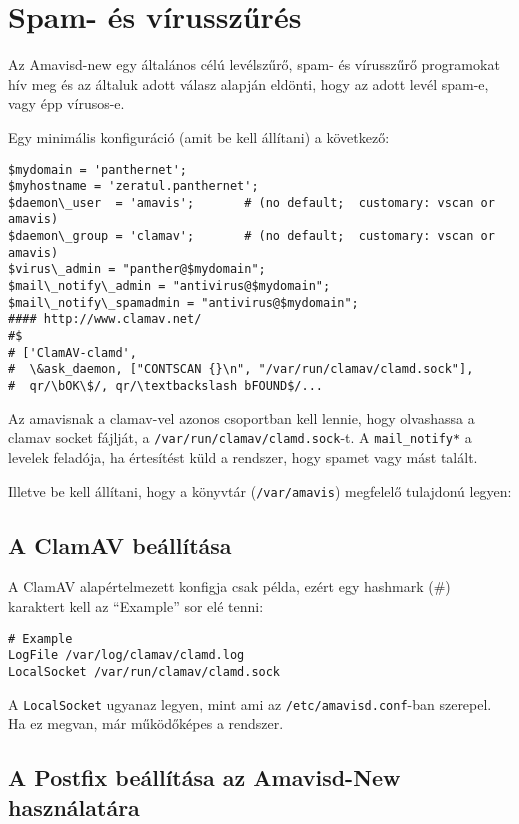 \chapter{Spam- és vírusszűrés}\label{chap:spams-viruses}
Az Amavisd-new egy általános célú levélszűrő, spam- és vírusszűrő programokat hív meg és az általuk adott válasz
alapján eldönti, hogy az adott levél spam-e, vagy épp vírusos-e.

Egy minimális konfiguráció (amit be kell állítani) a következő:

\begin{Verbatim}[frame=single,label=amavisd.conf részlet]
$mydomain = 'panthernet';
$myhostname = 'zeratul.panthernet';
$daemon\_user  = 'amavis';       # (no default;  customary: vscan or amavis)
$daemon\_group = 'clamav';       # (no default;  customary: vscan or amavis)
$virus\_admin = "panther@$mydomain";
$mail\_notify\_admin = "antivirus@$mydomain";
$mail\_notify\_spamadmin = "antivirus@$mydomain";
#### http://www.clamav.net/ 
#$
# ['ClamAV-clamd',
#  \&ask_daemon, ["CONTSCAN {}\n", "/var/run/clamav/clamd.sock"],
#  qr/\bOK\$/, qr/\textbackslash bFOUND$/...
\end{Verbatim}

Az amavisnak a clamav-vel azonos csoportban kell lennie, hogy olvashassa a clamav socket fájlját, a
\texttt{/var/run/clamav/clamd.sock}-t.
A \texttt{mail\_notify*} a levelek feladója, ha értesítést küld a rendszer, hogy spamet vagy mást talált.


Illetve be kell állítani, hogy a könyvtár (\texttt{/var/amavis}) megfelelő tulajdonú legyen:


\section{A ClamAV beállítása}
A ClamAV alapértelmezett konfigja csak példa, ezért egy hashmark (\#) karaktert kell az ``Example'' sor elé tenni:

\begin{Verbatim}[frame=single,label=clamd.conf részlet]
# Example
LogFile /var/log/clamav/clamd.log
LocalSocket /var/run/clamav/clamd.sock
\end{Verbatim}


A \texttt{LocalSocket} ugyanaz legyen, mint ami az \texttt{/etc/amavisd.conf}-ban szerepel. Ha ez megvan, már
működőképes a rendszer.

\section{A Postfix beállítása az Amavisd-New használatára}

